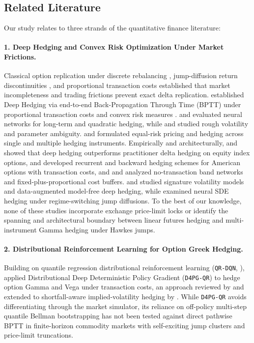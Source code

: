 \documentclass[11pt,a4paper]{article}
\begin{document}
\subsection{Related Literature}
Our study relates to three strands of the quantitative finance literature:

\paragraph{1. Deep Hedging and Convex Risk Optimization Under Market Frictions.}
Classical option replication under discrete rebalancing \citep{BoyleEmanuel1980}, jump-diffusion return discontinuities \citep{Merton1976,Bakshi1997}, and proportional transaction costs \citep{Leland1985,Whalley1997} established that market incompleteness and trading frictions prevent exact delta replication. \citet{Buehler2019} established Deep Hedging via end-to-end Back-Propagation Through Time (BPTT) under proportional transaction costs and convex risk measures \citep{Rockafellar2000}. \citet{Carbonneau2021} and \citet{Dai2022} evaluated neural networks for long-term and quadratic hedging, while \citet{Horvath2021} and \citet{Luetkebohmert2022} studied rough volatility and parameter ambiguity. \citet{Marzban2022} and \citet{CarbonneauGodin2024} formulated equal-risk pricing and hedging across single and multiple hedging instruments. Empirically and architecturally, \citet{Mikkila2023} and \citet{Francois2025} showed that deep hedging outperforms practitioner delta hedging on equity index options, \citet{NaWan2023} and \citet{Goudenege2023} developed recurrent and backward hedging schemes for American options with transaction costs, and \citet{Imaki2023} and \citet{Babaei2024} analyzed no-transaction band networks and fixed-plus-proportional cost buffers. \citet{AbiJaber2025} and \citet{Brugiere2026} studied signature volatility models and data-augmented model-free deep hedging, while \citet{Shakeel2026} examined neural SDE hedging under regime-switching jump diffusions. To the best of our knowledge, none of these studies incorporate exchange price-limit locks or identify the spanning and architectural boundary between linear futures hedging and multi-instrument Gamma hedging under Hawkes jumps.

\paragraph{2. Distributional Reinforcement Learning for Option Greek Hedging.}
Building on quantile regression distributional reinforcement learning (\texttt{QR-DQN}, \citealt{Dabney2018}), \citet{Cao2023} applied Distributional Deep Deterministic Policy Gradient (\texttt{D4PG-QR}) to hedge option Gamma and Vega under transaction costs, an approach reviewed by \citet{Pickard2023} and extended to shortfall-aware implied-volatility hedging by \citet{ChenHu2026}. While \texttt{D4PG-QR} avoids differentiating through the market simulator, its reliance on off-policy multi-step quantile Bellman bootstrapping has not been tested against direct pathwise BPTT in finite-horizon commodity markets with self-exciting jump clusters and price-limit truncations.
\end{document}
